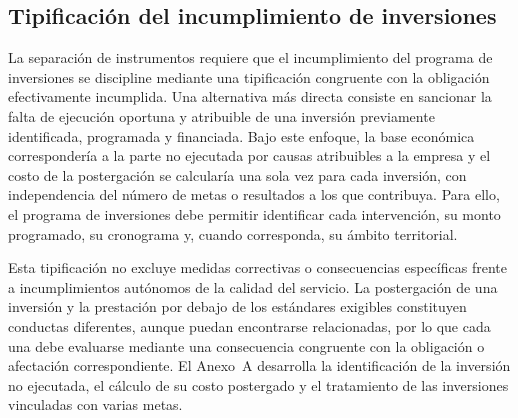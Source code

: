 \subsection{Tipificación del incumplimiento de inversiones}

La separación de instrumentos requiere que el incumplimiento del programa de inversiones se discipline mediante una tipificación congruente con la obligación efectivamente incumplida. Una alternativa más directa consiste en sancionar la falta de ejecución oportuna y atribuible de una inversión previamente identificada, programada y financiada. Bajo este enfoque, la base económica correspondería a la parte no ejecutada por causas atribuibles a la empresa y el costo de la postergación se calcularía una sola vez para cada inversión, con independencia del número de metas o resultados a los que contribuya. Para ello, el programa de inversiones debe permitir identificar cada intervención, su monto programado, su cronograma y, cuando corresponda, su ámbito territorial.

Esta tipificación no excluye medidas correctivas o consecuencias específicas frente a incumplimientos autónomos de la calidad del servicio. La postergación de una inversión y la prestación por debajo de los estándares exigibles constituyen conductas diferentes, aunque puedan encontrarse relacionadas, por lo que cada una debe evaluarse mediante una consecuencia congruente con la obligación o afectación correspondiente. El Anexo~A desarrolla la identificación de la inversión no ejecutada, el cálculo de su costo postergado y el tratamiento de las inversiones vinculadas con varias metas.
